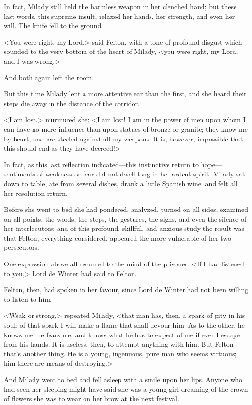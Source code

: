 In fact, Milady still held the harmless weapon in her clenched hand; but these last words, this supreme insult, relaxed her hands, her strength, and even her will. The knife fell to the ground. 

<You were right, my Lord,> said Felton, with a tone of profound disgust which sounded to the very bottom of the heart of Milady, <you were right, my Lord, and I was wrong.> 

And both again left the room. 

But this time Milady lent a more attentive ear than the first, and she heard their steps die away in the distance of the corridor. 

<I am lost,> murmured she; <I am lost! I am in the power of men upon whom I can have no more influence than upon statues of bronze or granite; they know me by heart, and are steeled against all my weapons. It is, however, impossible that this should end as they have decreed!> 

In fact, as this last reflection indicated—this instinctive return to hope—sentiments of weakness or fear did not dwell long in her ardent spirit. Milady sat down to table, ate from several dishes, drank a little Spanish wine, and felt all her resolution return. 

Before she went to bed she had pondered, analyzed, turned on all sides, examined on all points, the words, the steps, the gestures, the signs, and even the silence of her interlocutors; and of this profound, skillful, and anxious study the result was that Felton, everything considered, appeared the more vulnerable of her two persecutors. 

One expression above all recurred to the mind of the prisoner: <If I had listened to you,> Lord de Winter had said to Felton. 

Felton, then, had spoken in her favour, since Lord de Winter had not been willing to listen to him. 

<Weak or strong,> repeated Milady, <that man has, then, a spark of pity in his soul; of that spark I will make a flame that shall devour him. As to the other, he knows me, he fears me, and knows what he has to expect of me if ever I escape from his hands. It is useless, then, to attempt anything with him. But Felton—that's another thing. He is a young, ingenuous, pure man who seems virtuous; him there are means of destroying.> 

And Milady went to bed and fell asleep with a smile upon her lips. Anyone who had seen her sleeping might have said she was a young girl dreaming of the crown of flowers she was to wear on her brow at the next festival.